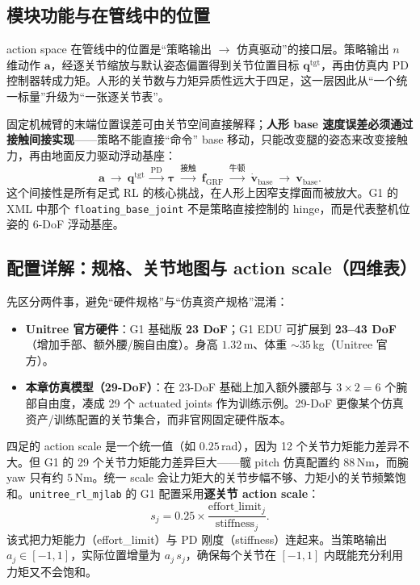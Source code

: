 \subsection{模块功能与在管线中的位置}
action space 在管线中的位置是“策略输出 $\to$ 仿真驱动”的接口层。策略输出 $n$ 维动作 $\mathbf{a}$，经逐关节缩放与默认姿态偏置得到关节位置目标 $\mathbf{q}^{\mathrm{tgt}}$，再由仿真内 PD 控制器转成力矩。人形的关节数与力矩异质性远大于四足，这一层因此从“一个统一标量”升级为“一张逐关节表”。

\begin{insight}\label{ins:rlmc-hl-indirect}
固定机械臂的末端位置误差可由关节空间直接解释；\textbf{人形 base 速度误差必须通过接触间接实现}——策略不能直接“命令” base 移动，只能改变腿的姿态来改变接触力，再由地面反力驱动浮动基座：
\[
\mathbf{a}\ \to\ \mathbf{q}^{\mathrm{tgt}}\ \xrightarrow{\text{PD}}\ \boldsymbol\tau\ \xrightarrow{\text{接触}}\ \mathbf{f}_{\mathrm{GRF}}\ \xrightarrow{\text{牛顿}}\ \dot{\mathbf{v}}_{\mathrm{base}}\ \to\ \mathbf{v}_{\mathrm{base}}.
\]
这个间接性是所有足式 RL 的核心挑战，在人形上因窄支撑面而被放大。G1 的 XML 中那个 \texttt{floating\_base\_joint} 不是策略直接控制的 hinge，而是代表整机位姿的 6-DoF 浮动基座。
\end{insight}

\subsection{配置详解：规格、关节地图与 action scale（四维表）}
先区分两件事，避免“硬件规格”与“仿真资产规格”混淆：

\begin{itemize}
  \item \textbf{Unitree 官方硬件}：G1 基础版 \textbf{23 DoF}；G1 EDU 可扩展到 \textbf{23--43 DoF}（增加手部、额外腰/腕自由度）。身高 $1.32$\,m、体重 $\sim 35$\,kg（Unitree 官方）。
  \item \textbf{本章仿真模型（29-DoF）}：在 23-DoF 基础上加入额外腰部与 $3\times2=6$ 个腕部自由度，凑成 29 个 actuated joints 作为训练示例。29-DoF 更像某个仿真资产/训练配置的关节集合，而非官网固定硬件版本。
\end{itemize}

四足的 action scale 是一个统一值（如 $0.25$\,rad），因为 12 个关节力矩能力差异不大。但 G1 的 29 个关节力矩能力差异巨大——髋 pitch 仿真配置约 $88$\,Nm，而腕 yaw 只有约 $5$\,Nm。统一 scale 会让力矩大的关节步幅不够、力矩小的关节频繁饱和。\texttt{unitree\_rl\_mjlab} 的 G1 配置采用\textbf{逐关节 action scale}：
\begin{equation}
s_j = 0.25\times\frac{\text{effort\_limit}_j}{\text{stiffness}_j}.
\label{eq:rlmc-hl-actionscale}
\end{equation}
该式把力矩能力（effort\_limit）与 PD 刚度（stiffness）连起来。当策略输出 $a_j\in[-1,1]$，实际位置增量为 $a_j\,s_j$，确保每个关节在 $[-1,1]$ 内既能充分利用力矩又不会饱和。

